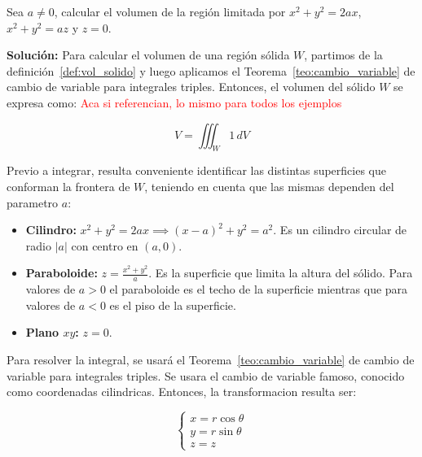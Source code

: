
\vspace{0.5 cm}
\begin{example}  Sea $a \neq 0$, calcular el volumen de la región limitada por $x^2 + y^2 = 2ax$, $x^2 + y^2 = az$ y $z = 0.$ 
\end{example}

\textbf{Soluci\'on:}
Para calcular el volumen de una región sólida $W$, partimos de la definición~\ref{def:vol_solido} y luego aplicamos el Teorema~\ref{teo:cambio_variable} de cambio de variable para integrales triples. Entonces, el volumen del sólido $W$ se expresa como: \textcolor{red}{Aca si referencian, lo mismo para todos los ejemplos }


\begin{equation}
    V = \iiint_{W} 1 \, dV
\end{equation}

Previo a integrar, resulta conveniente identificar las distintas superficies que conforman la frontera de $W$, teniendo en cuenta que las mismas dependen del parametro $a$:
\begin{itemize}
    \item \textbf{Cilindro:} $x^2 + y^2 = 2ax \implies (x-a)^2 + y^2 = a^2$. Es un cilindro circular de radio $|a|$ con centro en $(a,0)$.
    \item \textbf{Paraboloide:} $z = \frac{x^2 + y^2}{a}$. Es la superficie que limita la altura del sólido. Para valores de $a > 0$ el paraboloide es el techo de la superficie mientras que para valores de $a < 0$ es el piso de la superficie. 
    \item \textbf{Plano $xy$:} $z = 0$.
\end{itemize}


\begin{figure}[htbp]
    \centering
     
    \label{fig:Ejemplo 8.2.4}
\end{figure}
     
Para resolver la integral, se usará el Teorema~\ref{teo:cambio_variable} de cambio de variable para integrales triples. Se usara el cambio de variable famoso, conocido como coordenadas cilindricas. Entonces, la transformacion resulta ser:

\begin{equation*}
    \begin{cases} 
        x = r \cos \theta \\ 
        y = r \sin \theta \\ 
        z = z 
    \end{cases}
\end{equation*}

